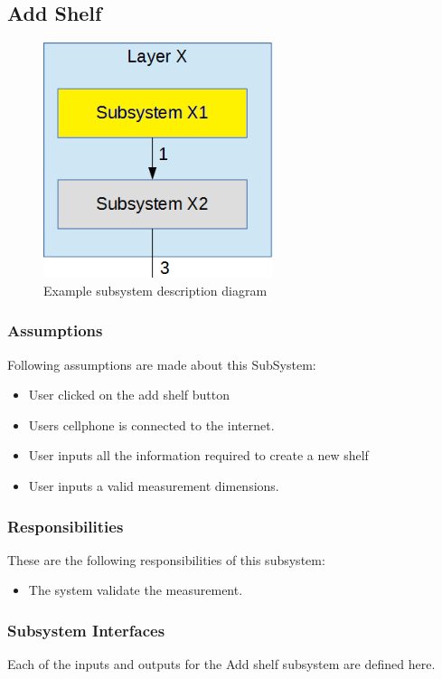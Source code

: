 \subsection{Add Shelf}


\begin{figure}[h!]
	\centering
 	\includegraphics[width=0.60\textwidth]{images/subsystem}
 \caption{Example subsystem description diagram}
\end{figure}

\subsubsection{Assumptions}
Following assumptions are made about this SubSystem:
\begin{itemize}
    \item User clicked on the add shelf button
    \item Users cellphone is connected to the internet.
    \item User inputs all the information required to create a new shelf
    \item User inputs a valid measurement dimensions.
\end{itemize}

\subsubsection{Responsibilities}
These are the following responsibilities of this subsystem:
\begin{itemize}
    \item The system validate the measurement.
\end{itemize}

\subsubsection{Subsystem Interfaces}
Each of the inputs and outputs for the Add shelf subsystem are defined here.

